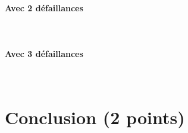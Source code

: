 \documentclass[a4paper]{book}
\begin{document}
\paragraph{Avec 2 défaillances}\ \\


\paragraph{Avec 3 défaillances}\ \\


\section{Conclusion (2 points)}
\end{document}
